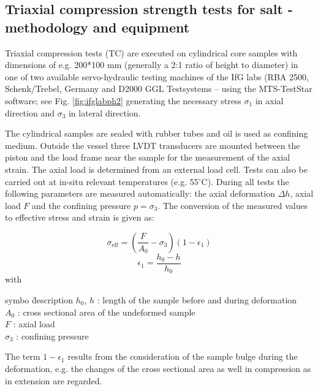 \subsection{Triaxial compression strength tests for salt - methodology and equipment}


Triaxial compression tests (TC) are executed on cylindrical core samples with dimensions of e.g. 200*100 mm (generally a 2:1 ratio of height to diameter) in one of two available servo-hydraulic testing machines of the IfG labs (RBA 2500, Schenk/Trebel, Germany and D2000 GGL Testsystems – using the MTS-TestStar software; see Fig. \ref{fig:ifglabph2} generating the necessary stress $\sigma_1$ in axial direction and $\sigma_3$ in lateral direction.

The cylindrical samples are sealed with rubber tubes and oil is used as confining medium. Outside the vessel three LVDT transducers are mounted between the piston and the load frame near the sample for the measurement of the axial strain. The axial load is determined from an external load cell. Tests can also be carried out at in-situ relevant temperatures (e.g. 55$^\circ$C). During all tests the following parameters are measured automatically: the axial deformation $\Delta h$, axial load $F$ and the confining pressure $p = \sigma_3$. The conversion of the measured values to effective stress and strain is given as:

\begin{equation}
\sigma_\text{eff} = \left(\frac{F}{A_0}-\sigma_3 \right) (1-\epsilon_1)
\end{equation}
\begin{equation}
\epsilon_1 = \frac{h_0-h}{h_0}
\end{equation}
with
\begin{tabbing}
symbo \= description \kill
$h_0$, $h$ : \> length of the sample before and during deformation \\
$A_0$ : \> cross sectional area of the undeformed sample \\
$F$ : \> axial load  \\
$\sigma_3$ : \> confining pressure 
\end{tabbing}

The term $1-\epsilon_1$ results from the consideration of the sample bulge during the deformation, e.g. the changes of the cross sectional area as well in compression as in extension are regarded.

